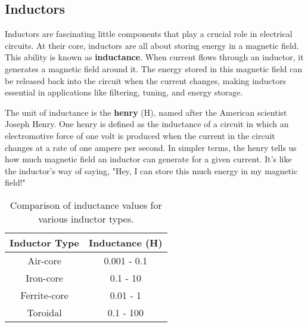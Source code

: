 \subsection{Inductors}
\label{subsec:inductors}

Inductors are fascinating little components that play a crucial role in electrical circuits. At their core, inductors are all about storing energy in a magnetic field. This ability is known as \textbf{inductance}. When current flows through an inductor, it generates a magnetic field around it. The energy stored in this magnetic field can be released back into the circuit when the current changes, making inductors essential in applications like filtering, tuning, and energy storage.

The unit of inductance is the \textbf{henry} (H), named after the American scientist Joseph Henry. One henry is defined as the inductance of a circuit in which an electromotive force of one volt is produced when the current in the circuit changes at a rate of one ampere per second. In simpler terms, the henry tells us how much magnetic field an inductor can generate for a given current. It's like the inductor's way of saying, "Hey, I can store this much energy in my magnetic field!"


\begin{table}[h]
    \centering
    \begin{tabular}{|c|c|}
        \hline
        \textbf{Inductor Type} & \textbf{Inductance (H)} \\
        \hline
        Air-core & 0.001 - 0.1 \\
        Iron-core & 0.1 - 10 \\
        Ferrite-core & 0.01 - 1 \\
        Toroidal & 0.1 - 100 \\
        \hline
    \end{tabular}
    \caption{Comparison of inductance values for various inductor types.}
    \label{tab:inductance-values}
\end{table}

